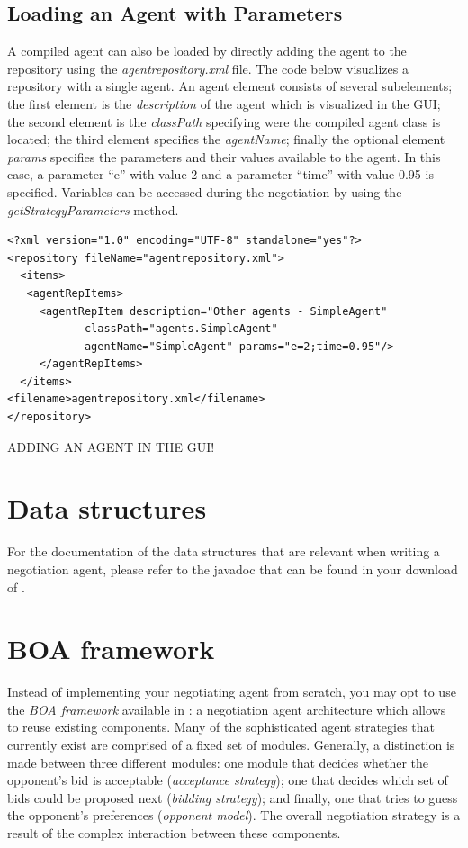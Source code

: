 \documentclass[]{article}
\begin{document}
\subsection{Loading an Agent with Parameters}
A compiled agent can also be loaded by directly adding the agent to the repository using the \textit{agentrepository.xml} file. The code below visualizes a repository with a single agent. An agent element consists of several subelements; the first element is the \textit{description} of the agent which is visualized in the GUI; the second element is the \textit{classPath} specifying were the compiled agent class is located; the third element specifies the \textit{agentName}; finally the optional element \textit{params} specifies the parameters and their values available to the agent. In this case, a parameter ``e'' with value 2 and a parameter ``time'' with value 0.95 is specified. Variables can be accessed during the negotiation by using the \textit{getStrategyParameters} method.

\begin{lstlisting}
<?xml version="1.0" encoding="UTF-8" standalone="yes"?>
<repository fileName="agentrepository.xml">
  <items>
   <agentRepItems>
     <agentRepItem description="Other agents - SimpleAgent"
			classPath="agents.SimpleAgent"
			agentName="SimpleAgent" params="e=2;time=0.95"/>
     </agentRepItems>
  </items>
<filename>agentrepository.xml</filename>
</repository>
\end{lstlisting}
 
ADDING AN AGENT IN THE GUI!

\section{Data structures}
For the documentation of the data structures that are relevant when writing a negotiation agent, please refer to the javadoc that can be found in your download of \Genius. 

\section{BOA framework}\label{sec:boa}
Instead of implementing your negotiating agent from scratch, you may opt to use the \textit{BOA framework} available in \Genius: a negotiation agent architecture which allows to reuse existing components. Many of the sophisticated agent strategies that currently exist are comprised of a fixed set of modules. Generally, a distinction is made between three different modules: one module that decides whether the opponent's bid is acceptable (\textit{acceptance strategy}); one that decides which set of bids could be proposed next (\textit{bidding strategy}); and finally, one that tries to guess the opponent's preferences (\textit{opponent model}). The overall negotiation strategy is a result of the complex interaction between these components.
\end{document}
